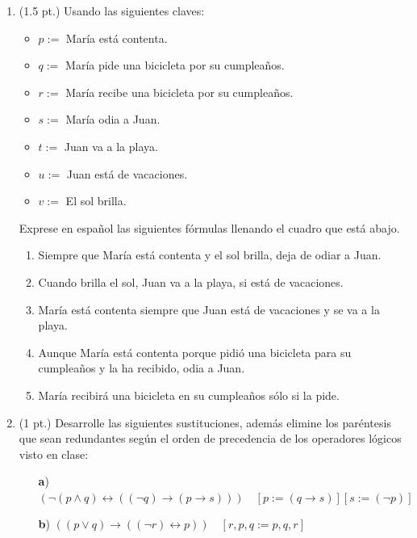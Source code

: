 \documentclass[11pt,letterpaper]{article}
\begin{document}
\begin{enumerate}
  
  \item (1.5 pt.) Usando las siguientes claves:
    \begin{itemize}
       \item $p :=$ María está contenta.
       \item $q :=$ María pide una bicicleta por su cumpleaños.
       \item $r :=$ María recibe una bicicleta por su cumpleaños.
       \item $s :=$ María odia a Juan.
       \item $t :=$ Juan va a la playa.
       \item $u :=$ Juan está de vacaciones.
       \item $v :=$ El sol brilla.
    \end{itemize}
    
    Exprese en español las siguientes fórmulas llenando el cuadro que está abajo.
    \begin{enumerate}
       \item Siempre que María está contenta y el sol brilla, deja de odiar a Juan.
       \item Cuando brilla el sol, Juan va a la playa, si está de vacaciones.
       \item María está contenta siempre que Juan está de vacaciones y se va a la playa.
       \item Aunque María está contenta porque pidió una bicicleta para su cumpleaños y la ha recibido, odia a Juan.
       \item María recibirá una bicicleta en su cumpleaños sólo si la pide.
    \end{enumerate}

  \bigskip
  
  \item (1 pt.) Desarrolle las siguientes sustituciones, además elimine los paréntesis que sean redundantes según el orden de precedencia de los operadores lógicos visto en clase:
      
    \begin{itemize}
       \item[\textbf{a})] $\left( \neg (p \land q) \leftrightarrow \left( (\neg q) \rightarrow (p \rightarrow s) \right) \right) \quad [p := (q \rightarrow s)] [s := (\neg p)]$
       \item[\textbf{b})] $\left( (p \lor q) \rightarrow ((\neg r) \leftrightarrow p) \right) \quad [r, p, q := p, q, r]$
    \end{itemize}


\end{enumerate}
\end{document}
